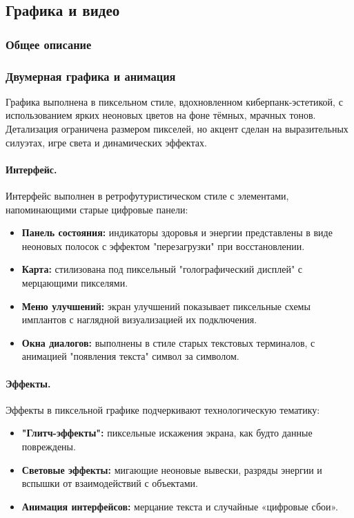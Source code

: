 \documentclass{article}
\begin{document}
\begin{itemize}
\subsection{Графика и видео}

\subsubsection{Общее описание}


\subsubsection{Двумерная графика и анимация}

Графика выполнена в пиксельном стиле, вдохновленном киберпанк-эстетикой, с использованием ярких неоновых цветов на фоне тёмных, мрачных тонов. Детализация ограничена размером пикселей, но акцент сделан на выразительных силуэтах, игре света и динамических эффектах.

\paragraph{Интерфейс.}
Интерфейс выполнен в ретрофутуристическом стиле с элементами, напоминающими старые цифровые панели:
\begin{itemize}
    \item \textbf{Панель состояния:} индикаторы здоровья и энергии представлены в виде неоновых полосок с эффектом "перезагрузки" при восстановлении.
    \item \textbf{Карта:} стилизована под пиксельный "голографический дисплей" с мерцающими пикселями.
    \item \textbf{Меню улучшений:} экран улучшений показывает пиксельные схемы имплантов с наглядной визуализацией их подключения.
    \item \textbf{Окна диалогов:} выполнены в стиле старых текстовых терминалов, с анимацией "появления текста" символ за символом.
\end{itemize}

\paragraph{Эффекты.}
Эффекты в пиксельной графике подчеркивают технологическую тематику:
\begin{itemize}
    \item \textbf{"Глитч-эффекты":} пиксельные искажения экрана, как будто данные повреждены.
    \item \textbf{Световые эффекты:} мигающие неоновые вывески, разряды энергии и вспышки от взаимодействий с объектами.
    \item \textbf{Анимация интерфейсов:} мерцание текста и случайные «цифровые сбои».
\end{itemize}


\end{itemize}
\end{document}
